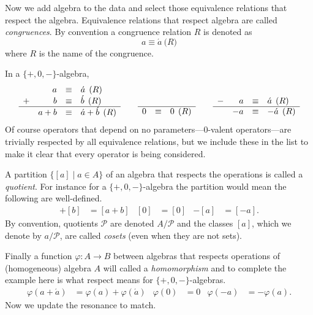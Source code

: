 Now we add algebra to the data and select those equivalence relations that respect the algebra.
Equivalence relations that respect algebra are called \emph{congruences}.
By convention a congruence relation $R$ is denoted as 
\[  
    a\equiv\acute{a}\pod{R}
\]
where $R$ is the name of the congruence.
\begin{example}
    In a $\{+,0,-\}$-algebra,
    \[
        \begin{array}{crcl}
            & a & \equiv & \acute{a} \pod{R}\\
        + &  b & \equiv & \acute{b} \pod{R}\\
        \hline 
            & a+b & \equiv & \acute{a}+\acute{b}\pod{R}
        \end{array}
        \qquad 
        \begin{array}{rcl}
            \\
            \\
        \hline 
            0 & \equiv& 0 \pod{R}
        \end{array}
        \qquad 
        \begin{array}{crcl}
            \\
        -   & a & \equiv & \acute{a} \pod{R}\\
        \hline 
            &  -a & \equiv & -\acute{a} \pod{R}
        \end{array}
    \]
    Of course operators that depend on no parameters---0-valent operators---are 
    trivially respected by all equivalence relations, but we include these 
    in the list to make it clear that every operator is being considered.
\end{example}

A partition $\{[a]\mid a\in A\}$ of an algebra that respects the operations is called a \emph{quotient}.
For instance for a $\{+,0,-\}$-algebra the partition would mean the following are well-defined.
\begin{align*}
    [a]+[b] & = [a+b] 
    & 
    [0] & = [0] 
    &
    -[a] & = [-a].
\end{align*}
By convention, quotients $\mathcal{P}$ are denoted $A/\mathcal{P}$ and the classes $[a]$, which we denote 
by $a/\mathcal{P}$, are called \emph{cosets} (even when they are not sets).

Finally a function $\varphi:A\to B$ between algebras that respects operations of (homogeneous) algebra $A$ will called a 
\emph{homomorphism} and to complete the example here is what respect means for $\{+,0,-\}$-algebras.
\begin{align*}
    \varphi(a+\acute{a}) & = \varphi(a)+\varphi(\acute{a})
    & 
    \varphi(0) & = 0
    &
    \varphi(-a) & = -\varphi(a).
\end{align*}
Now we update the resonance to match.

